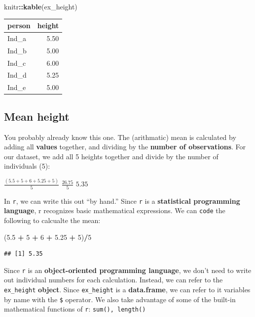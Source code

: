 \documentclass[
]{book}
\newenvironment{Shaded}{\begin{snugshade}}{\end{snugshade}}
\newcommand{\DecValTok}[1]{\textcolor[rgb]{0.00,0.00,0.81}{#1}}
\newcommand{\FloatTok}[1]{\textcolor[rgb]{0.00,0.00,0.81}{#1}}
\newcommand{\FunctionTok}[1]{\textcolor[rgb]{0.13,0.29,0.53}{\textbf{#1}}}
\newcommand{\NormalTok}[1]{#1}
\newcommand{\SpecialCharTok}[1]{\textcolor[rgb]{0.81,0.36,0.00}{\textbf{#1}}}
\begin{document}
\begin{Shaded}
\begin{Highlighting}[]
\NormalTok{knitr}\SpecialCharTok{::}\FunctionTok{kable}\NormalTok{(ex\_height)}
\end{Highlighting}
\end{Shaded}

\begin{tabular}{l|r}
\hline
person & height\\
\hline
Ind\_a & 5.50\\
\hline
Ind\_b & 5.00\\
\hline
Ind\_c & 6.00\\
\hline
Ind\_d & 5.25\\
\hline
Ind\_e & 5.00\\
\hline
\end{tabular}

\hypertarget{mean-height}{%
\subsection{Mean height}\label{mean-height}}

You probably already know this one. The (arithmatic) mean is calculated by adding all \textbf{values} together, and dividing by the \textbf{number of observations}. For our dataset, we add all 5 heights together and divide by the number of individuals (5):

\(\frac{(5.5 + 5 + 6 + 5.25 + 5)}{5}\)
\(\frac{26.75}{5}\)
\(5.35\)

In \texttt{r}, we can write this out ``by hand.'' Since \texttt{r} is a \textbf{statistical programming language}, r recognizes basic mathematical expressions. We can \texttt{code} the following to calcualte the mean:

\begin{Shaded}
\begin{Highlighting}[]
\NormalTok{(}\FloatTok{5.5} \SpecialCharTok{+} \DecValTok{5} \SpecialCharTok{+} \DecValTok{6} \SpecialCharTok{+} \FloatTok{5.25} \SpecialCharTok{+} \DecValTok{5}\NormalTok{)}\SpecialCharTok{/}\DecValTok{5}
\end{Highlighting}
\end{Shaded}

\begin{verbatim}
## [1] 5.35
\end{verbatim}

Since \texttt{r} is an \textbf{object-oriented programming language}, we don't need to write out individual numbers for each calculation. Instead, we can refer to the \texttt{ex\_height} \textbf{object}. Since \texttt{ex\_height} is a \textbf{data.frame}, we can refer to it variables by name with the \texttt{\$} operator. We also take advantage of some of the built-in mathematical functions of \texttt{r}: \texttt{sum(),\ length()}
\end{document}
